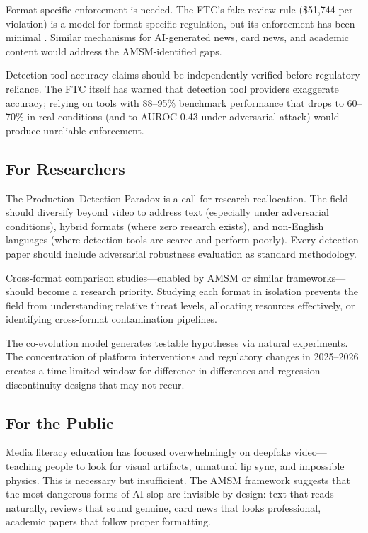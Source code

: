 \documentclass[12pt,a4paper]{article}
\begin{document}
Format-specific enforcement is needed. The FTC's fake review rule (\$51,744 per violation) is a model for format-specific regulation, but its enforcement has been minimal \parencite{FTC2024}. Similar mechanisms for AI-generated news, card news, and academic content would address the AMSM-identified gaps.

Detection tool accuracy claims should be independently verified before regulatory reliance. The FTC itself has warned that detection tool providers exaggerate accuracy; relying on tools with 88--95\% benchmark performance that drops to 60--70\% in real conditions (and to AUROC 0.43 under adversarial attack) would produce unreliable enforcement.

\subsection{For Researchers}

The Production--Detection Paradox is a call for research reallocation. The field should diversify beyond video to address text (especially under adversarial conditions), hybrid formats (where zero research exists), and non-English languages (where detection tools are scarce and perform poorly). Every detection paper should include adversarial robustness evaluation as standard methodology.

Cross-format comparison studies---enabled by AMSM or similar frameworks---should become a research priority. Studying each format in isolation prevents the field from understanding relative threat levels, allocating resources effectively, or identifying cross-format contamination pipelines.

The co-evolution model generates testable hypotheses via natural experiments. The concentration of platform interventions and regulatory changes in 2025--2026 creates a time-limited window for difference-in-differences and regression discontinuity designs that may not recur.

\subsection{For the Public}

Media literacy education has focused overwhelmingly on deepfake video---teaching people to look for visual artifacts, unnatural lip sync, and impossible physics. This is necessary but insufficient. The AMSM framework suggests that the most dangerous forms of AI slop are invisible by design: text that reads naturally, reviews that sound genuine, card news that looks professional, academic papers that follow proper formatting.
\end{document}
